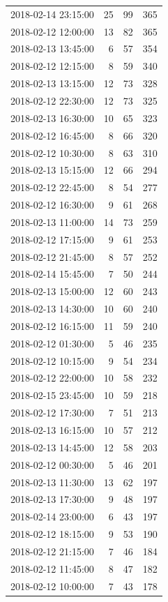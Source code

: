 \begin{tabular}{lrrr}
2018-02-14 23:15:00 & 25 & 99 & 365 \\
2018-02-12 12:00:00 & 13 & 82 & 365 \\
2018-02-13 13:45:00 & 6 & 57 & 354 \\
2018-02-12 12:15:00 & 8 & 59 & 340 \\
2018-02-13 13:15:00 & 12 & 73 & 328 \\
2018-02-12 22:30:00 & 12 & 73 & 325 \\
2018-02-13 16:30:00 & 10 & 65 & 323 \\
2018-02-12 16:45:00 & 8 & 66 & 320 \\
2018-02-12 10:30:00 & 8 & 63 & 310 \\
2018-02-13 15:15:00 & 12 & 66 & 294 \\
2018-02-12 22:45:00 & 8 & 54 & 277 \\
2018-02-12 16:30:00 & 9 & 61 & 268 \\
2018-02-13 11:00:00 & 14 & 73 & 259 \\
2018-02-12 17:15:00 & 9 & 61 & 253 \\
2018-02-12 21:45:00 & 8 & 57 & 252 \\
2018-02-14 15:45:00 & 7 & 50 & 244 \\
2018-02-13 15:00:00 & 12 & 60 & 243 \\
2018-02-13 14:30:00 & 10 & 60 & 240 \\
2018-02-12 16:15:00 & 11 & 59 & 240 \\
2018-02-12 01:30:00 & 5 & 46 & 235 \\
2018-02-12 10:15:00 & 9 & 54 & 234 \\
2018-02-12 22:00:00 & 10 & 58 & 232 \\
2018-02-15 23:45:00 & 10 & 59 & 218 \\
2018-02-12 17:30:00 & 7 & 51 & 213 \\
2018-02-13 16:15:00 & 10 & 57 & 212 \\
2018-02-13 14:45:00 & 12 & 58 & 203 \\
2018-02-12 00:30:00 & 5 & 46 & 201 \\
2018-02-13 11:30:00 & 13 & 62 & 197 \\
2018-02-13 17:30:00 & 9 & 48 & 197 \\
2018-02-14 23:00:00 & 6 & 43 & 197 \\
2018-02-12 18:15:00 & 9 & 53 & 190 \\
2018-02-12 21:15:00 & 7 & 46 & 184 \\
2018-02-12 11:45:00 & 8 & 47 & 182 \\
2018-02-12 10:00:00 & 7 & 43 & 178 \\

\end{tabular}
